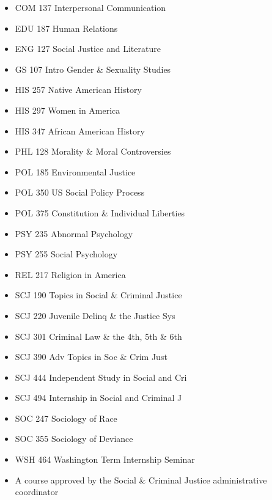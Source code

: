 \documentclass[
  letterpaper,
]{scrbook}
\providecommand{\tightlist}{%
  \setlength{\itemsep}{0pt}\setlength{\parskip}{0pt}}
\begin{document}
\begin{enumerate}
  \begin{itemize}
  \tightlist
  \item
    COM 137 Interpersonal Communication\\
  \item
    EDU 187 Human Relations\\
  \item
    ENG 127 Social Justice and Literature\\
  \item
    GS 107 Intro Gender \& Sexuality Studies\\
  \item
    HIS 257 Native American History\\
  \item
    HIS 297 Women in America\\
  \item
    HIS 347 African American History\\
  \item
    PHL 128 Morality \& Moral Controversies\\
  \item
    POL 185 Environmental Justice\\
  \item
    POL 350 US Social Policy Process\\
  \item
    POL 375 Constitution \& Individual Liberties\\
  \item
    PSY 235 Abnormal Psychology\\
  \item
    PSY 255 Social Psychology\\
  \item
    REL 217 Religion in America\\
  \item
    SCJ 190 Topics in Social \& Criminal Justice\\
  \item
    SCJ 220 Juvenile Delinq \& the Justice Sys\\
  \item
    SCJ 301 Criminal Law \& the 4th, 5th \& 6th\\
  \item
    SCJ 390 Adv Topics in Soc \& Crim Just\\
  \item
    SCJ 444 Independent Study in Social and Cri\\
  \item
    SCJ 494 Internship in Social and Criminal J\\
  \item
    SOC 247 Sociology of Race\\
  \item
    SOC 355 Sociology of Deviance\\
  \item
    WSH 464 Washington Term Internship Seminar\\
  \item
    A course approved by the Social \& Criminal Justice administrative
    coordinator
  \end{itemize}
\end{enumerate}
\end{document}
